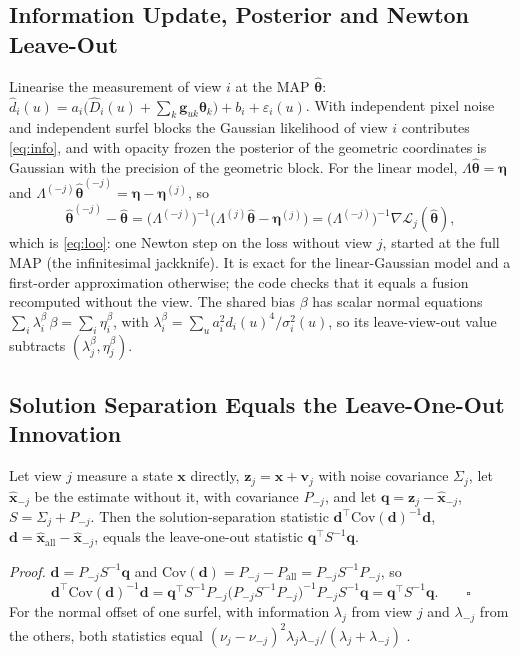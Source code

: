 \subsection{Information Update, Posterior and Newton Leave-Out}
Linearise the measurement of view $i$ at the MAP $\hat{\boldsymbol\theta}$: $\hat d_i(u)=a_i\bigl(\hat D_i(u)+\sum_k
\mathbf{g}_{uk}\boldsymbol\theta_k\bigr)+b_i+\varepsilon_i(u)$. With independent pixel noise and independent
surfel blocks the Gaussian likelihood of view $i$ contributes \eqref{eq:info}, and with opacity frozen the
posterior of the geometric coordinates is Gaussian with the precision of the geometric block. For the
linear model, $\Lambda\hat{\boldsymbol\theta}=\boldsymbol\eta$ and
$\Lambda^{(-j)}\hat{\boldsymbol\theta}^{(-j)}=\boldsymbol\eta-\boldsymbol\eta^{(j)}$, so
\[
\hat{\boldsymbol\theta}^{(-j)}-\hat{\boldsymbol\theta}=\bigl(\Lambda^{(-j)}\bigr)^{-1}\bigl(\Lambda^{(j)}\hat{\boldsymbol\theta}-\boldsymbol\eta^{(j)}\bigr)
=\bigl(\Lambda^{(-j)}\bigr)^{-1}\nabla\mathcal{L}_j(\hat{\boldsymbol\theta}),
\]
which is \eqref{eq:loo}: one Newton step on the loss without view $j$, started at the full MAP (the
infinitesimal jackknife). It is exact for the linear-Gaussian model and a first-order approximation
otherwise; the code checks that it equals a fusion recomputed without the view. The shared bias $\beta$
has scalar normal equations $\sum_i\lambda^{\beta}_i\,\beta=\sum_i\eta^{\beta}_i$, with $\lambda^{\beta}_i=\sum_u a_i^{2}d_i(u)^{4}/\sigma_i^{2}(u)$, so its leave-view-out value subtracts
$(\lambda^{\beta}_j,\eta^{\beta}_j)$.

\subsection{Solution Separation Equals the Leave-One-Out Innovation}
\begin{proposition}
\label{prop:loo}
Let view $j$ measure a state $\mathbf{x}$ directly, $\mathbf{z}_j=\mathbf{x}+\mathbf{v}_j$ with noise covariance
$\Sigma_j$, let $\hat{\mathbf{x}}_{-j}$ be the estimate without it, with covariance $P_{-j}$, and let
$\mathbf{q}=\mathbf{z}_j-\hat{\mathbf{x}}_{-j}$, $S=\Sigma_j+P_{-j}$. Then the solution-separation statistic
$\mathbf{d}^{\top}\mathrm{Cov}(\mathbf{d})^{-1}\mathbf{d}$, $\mathbf{d}=\hat{\mathbf{x}}_{\mathrm{all}}-\hat{\mathbf{x}}_{-j}$, equals the
leave-one-out statistic $\mathbf{q}^{\top}S^{-1}\mathbf{q}$.
\end{proposition}
\emph{Proof.} $\mathbf{d}=P_{-j}S^{-1}\mathbf{q}$ and $\mathrm{Cov}(\mathbf{d})=P_{-j}-P_{\mathrm{all}}=P_{-j}S^{-1}P_{-j}$, so
\[
\mathbf{d}^{\top}\mathrm{Cov}(\mathbf{d})^{-1}\mathbf{d}
=\mathbf{q}^{\top}S^{-1}P_{-j}\bigl(P_{-j}S^{-1}P_{-j}\bigr)^{-1}P_{-j}S^{-1}\mathbf{q}
=\mathbf{q}^{\top}S^{-1}\mathbf{q}.\qquad\square
\]
For the normal offset of one surfel, with information $\lambda_j$ from view $j$ and $\lambda_{-j}$ from the
others, both statistics equal $(\nu_j-\nu_{-j})^{2}\lambda_j\lambda_{-j}/(\lambda_j+\lambda_{-j})$
\cite{flt_raim_joerger}.

